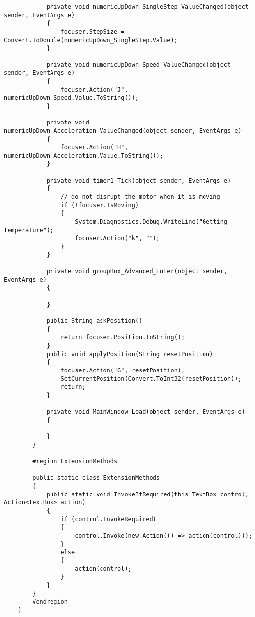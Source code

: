 \begin{lstlisting}
			private void numericUpDown_SingleStep_ValueChanged(object sender, EventArgs e)
			{
				focuser.StepSize = Convert.ToDouble(numericUpDown_SingleStep.Value);
			}
			
			private void numericUpDown_Speed_ValueChanged(object sender, EventArgs e)
			{
				focuser.Action("J", numericUpDown_Speed.Value.ToString());
			}
			
			private void numericUpDown_Acceleration_ValueChanged(object sender, EventArgs e)
			{
				focuser.Action("H", numericUpDown_Acceleration.Value.ToString());
			}
			
			private void timer1_Tick(object sender, EventArgs e)
			{
				// do not disrupt the motor when it is moving
				if (!focuser.IsMoving)
				{
					System.Diagnostics.Debug.WriteLine("Getting Temperature");
					focuser.Action("k", "");
				}
			}
			
			private void groupBox_Advanced_Enter(object sender, EventArgs e)
			{
				
			}
			
			public String askPosition()
			{
				return focuser.Position.ToString();
			}
			public void applyPosition(String resetPosition)
			{
				focuser.Action("G", resetPosition);
				SetCurrentPosition(Convert.ToInt32(resetPosition));
				return;
			}
			
			private void MainWindow_Load(object sender, EventArgs e)
			{
				
			}
		}
		
		#region ExtensionMethods
		
		public static class ExtensionMethods
		{
			public static void InvokeIfRequired(this TextBox control, Action<TextBox> action)
			{
				if (control.InvokeRequired)
				{
					control.Invoke(new Action(() => action(control)));
				}
				else
				{
					action(control);
				}
			}
		}
		#endregion
	}
	
\end{lstlisting}

